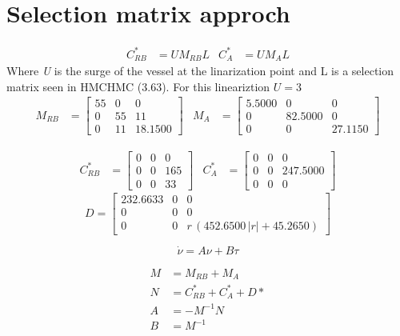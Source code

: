 \documentclass[12pt,a4]{article}
\begin{document}
\section{Selection matrix approch}

\begin{align}
	C^*_{RB} & = UM_{RB}L
	         &
	C^*_{A}  & = UM_AL
\end{align}
Where \textit{U} is the surge of the vessel at the linarization point and L is a selection matrix seen in HMCHMC (3.63).
For this lineariztion $U=3$
\begin{align}
	M_{RB} & = \left[\begin{array}{ccc} 55 & 0 & 0\\ 0 & 55 & 11\\ 0 & 11 & 18.1500 \end{array}\right]
	       &
	M_{A}  & = \left[\begin{array}{ccc} 5.5000 & 0 & 0\\ 0 & 82.5000 & 0\\ 0 & 0 & 27.1150 \end{array}\right]
\end{align}

\begin{align}
	C^*_{RB} & = \left[\begin{array}{ccc} 0 & 0 & 0\\ 0 & 0 & 165\\ 0 & 0 & 33 \end{array}\right]
	         &
	C^*_{A}  & = \left[\begin{array}{ccc} 0 & 0 & 0\\ 0 & 0 & 247.5000\\ 0 & 0 & 0 \end{array}\right]
\end{align}
\begin{equation}
	D = \left[\begin{array}{ccc} 232.6633 & 0 & 0\\ 0 & 0 & 0\\ 0 & 0 & r\,\left(452.6500\,\left|r\right|+45.2650\right) \end{array}\right]
\end{equation}

\begin{equation}
	\dot{\nu} = A \nu + B \tau
\end{equation}

\begin{align}
	M & = M_{RB} + M_A            \\
	N & = C^*_{RB} + C^*_{A} + D* \\
	A & = -M^{-1}N                \\
	B & = M^{-1}
\end{align}
\end{document}

